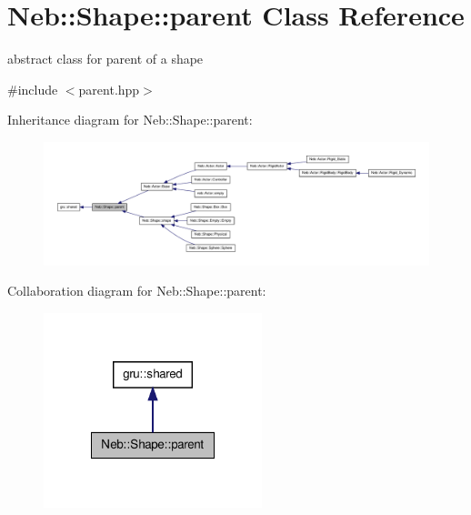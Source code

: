 \hypertarget{classNeb_1_1Shape_1_1parent}{\section{\-Neb\-:\-:\-Shape\-:\-:parent \-Class \-Reference}
\label{classNeb_1_1Shape_1_1parent}
}


abstract class for parent of a shape  




{\ttfamily \#include $<$parent.\-hpp$>$}



\-Inheritance diagram for \-Neb\-:\-:\-Shape\-:\-:parent\-:\nopagebreak
\begin{figure}[H]
\begin{center}
\leavevmode
\includegraphics[width=350pt]{classNeb_1_1Shape_1_1parent__inherit__graph}
\end{center}
\end{figure}


\-Collaboration diagram for \-Neb\-:\-:\-Shape\-:\-:parent\-:\nopagebreak
\begin{figure}[H]
\begin{center}
\leavevmode
\includegraphics[width=180pt]{classNeb_1_1Shape_1_1parent__coll__graph}
\end{center}
\end{figure}

